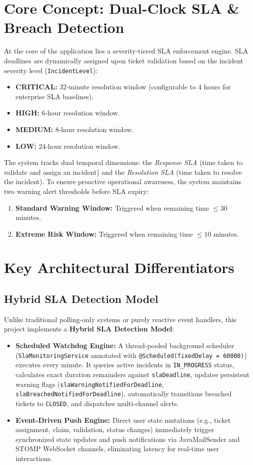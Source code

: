 \documentclass[12pt,a4paper]{report}
\begin{document}
\section{Core Concept: Dual-Clock SLA & Breach Detection}
At the core of the application lies a severity-tiered SLA enforcement engine. SLA deadlines are dynamically assigned upon ticket validation based on the incident severity level (\texttt{IncidentLevel}):
\begin{itemize}
    \item \textbf{CRITICAL:} 32-minute resolution window (configurable to 4 hours for enterprise SLA baselines).
    \item \textbf{HIGH:} 6-hour resolution window.
    \item \textbf{MEDIUM:} 8-hour resolution window.
    \item \textbf{LOW:} 24-hour resolution window.
\end{itemize}

The system tracks dual temporal dimensions: the \emph{Response SLA} (time taken to validate and assign an incident) and the \emph{Resolution SLA} (time taken to resolve the incident). To ensure proactive operational awareness, the system maintains two warning alert thresholds before SLA expiry:
\begin{enumerate}
    \item \textbf{Standard Warning Window:} Triggered when remaining time $\le 30$ minutes.
    \item \textbf{Extreme Risk Window:} Triggered when remaining time $\le 10$ minutes.
\end{enumerate}

\section{Key Architectural Differentiators}

\subsection{Hybrid SLA Detection Model}
Unlike traditional polling-only systems or purely reactive event handlers, this project implements a \textbf{Hybrid SLA Detection Model}:
\begin{itemize}
    \item \textbf{Scheduled Watchdog Engine:} A thread-pooled background scheduler (\texttt{SlaMonitoringService} annotated with \texttt{@Scheduled(fixedDelay = 60000)}) executes every minute. It queries active incidents in \texttt{IN\_PROGRESS} status, calculates exact duration remainders against \texttt{slaDeadline}, updates persistent warning flags (\texttt{slaWarningNotifiedForDeadline}, \texttt{slaBreachedNotifiedForDeadline}), automatically transitions breached tickets to \texttt{CLOSED}, and dispatches multi-channel alerts.
    \item \textbf{Event-Driven Push Engine:} Direct user state mutations (e.g., ticket assignment, claim, validation, status changes) immediately trigger synchronized state updates and push notifications via JavaMailSender and STOMP WebSocket channels, eliminating latency for real-time user interactions.
\end{itemize}
\end{document}
